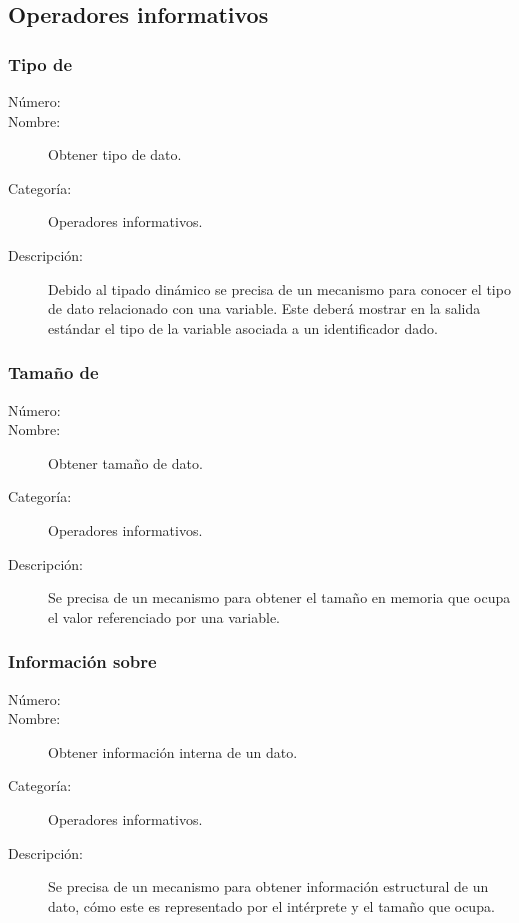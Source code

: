 \subsection{Operadores informativos}
\subsubsection{Tipo de}
\begin{framed}
	\begin{description}
		\item [Número:] \cn
		\item [Nombre:] Obtener tipo de dato.
		\item [Categoría:] Operadores informativos.
		\item [Descripción:] Debido al tipado dinámico se precisa de un mecanismo para conocer el tipo de dato relacionado
		con una variable. Este deberá mostrar en la salida estándar el tipo de la variable asociada a un identificador dado.
	\end {description}
\end{framed}

\subsubsection{Tamaño de}
\begin{framed}
	\begin{description}
		\item [Número:] \cn
		\item [Nombre:] Obtener tamaño de dato.
		\item [Categoría:] Operadores informativos.
		\item [Descripción:] Se precisa de un mecanismo para obtener el tamaño en memoria que ocupa el valor referenciado por una variable.
	\end {description}
\end{framed}

\subsubsection{Información sobre}
\begin{framed}
	\begin{description}
		\item [Número:] \cn
		\item [Nombre:] Obtener información interna de un dato.
		\item [Categoría:] Operadores informativos.
		\item [Descripción:] Se precisa de un mecanismo para obtener información estructural de un dato, cómo este es representado por 
      el intérprete y el tamaño que ocupa.
	\end {description}
\end{framed}
